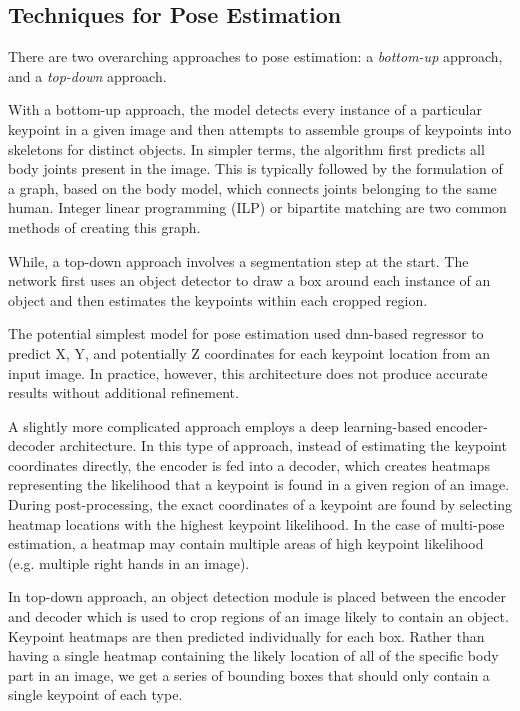 \subsection{Techniques for Pose Estimation} 
There are two overarching approaches to pose estimation: a \textit{bottom-up} approach, and a \textit{top-down }approach.

With a bottom-up approach, the model detects every instance of a particular keypoint in a given image and then attempts to assemble groups of keypoints into skeletons for distinct objects. In simpler terms, the algorithm first predicts all body joints present in the image. This is typically followed by the formulation of a graph, based on the body model, which connects joints belonging to the same human. Integer linear programming (ILP) or bipartite matching are two common methods of creating this graph.

While, a top-down approach involves a segmentation step at the start. The network first uses an object detector to draw a box around each instance of an object and then estimates the keypoints within each cropped region. 

The potential simplest model for pose estimation used \gls{dnn}-based regressor to predict X, Y, and potentially Z coordinates for each keypoint location from an input image. In practice, however, this architecture does not produce accurate results without additional refinement. 

A slightly more complicated approach employs a deep learning-based encoder-decoder architecture. In this type of approach, instead of estimating the keypoint coordinates directly, the encoder is fed into a decoder, which creates heatmaps representing the likelihood that a keypoint is found in a given region of an image. During post-processing, the exact coordinates of a keypoint are found by selecting heatmap locations with the highest keypoint likelihood. In the case of multi-pose estimation, a heatmap may contain multiple areas of high keypoint likelihood (e.g. multiple right hands in an image). 

In top-down approach, an object detection module is placed between the encoder and decoder which is used to crop regions of an image likely to contain an object. Keypoint heatmaps are then predicted individually for each box. Rather than having a single heatmap containing the likely location of all of the specific body part in an image, we get a series of bounding boxes that should only contain a single keypoint of each type. 

